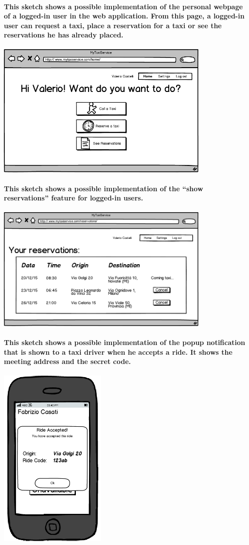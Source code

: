 \begin{center}
\paragraph{This sketch shows a possible implementation of the personal webpage of a logged-in user in the web application. From this page, a logged-in user can request a taxi, place a reservation for a taxi or see the reservations he has already placed.}
\includegraphics[width=300pt,keepaspectratio]{images/user_home.png}
\paragraph{This sketch shows a possible implementation of the “show reservations” feature for logged-in users.}
\includegraphics[width=300pt,keepaspectratio]{images/user_reservation.png}
\paragraph{This sketch shows a possible implementation of the popup notification that is shown to a taxi driver when he accepts a ride. It shows the meeting address and the secret code.}
\includegraphics[width=150pt,keepaspectratio]{images/taxi_accepted_ride.png}

\end{center}
